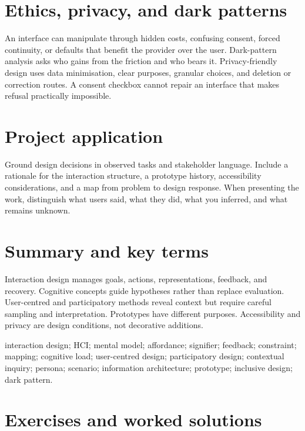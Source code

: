 \section{Ethics, privacy, and dark patterns}
An interface can manipulate through hidden costs, confusing consent, forced continuity, or defaults that benefit the provider over the user. Dark-pattern analysis asks who gains from the friction and who bears it. Privacy-friendly design uses data minimisation, clear purposes, granular choices, and deletion or correction routes. A consent checkbox cannot repair an interface that makes refusal practically impossible.

\section{Project application}
Ground design decisions in observed tasks and stakeholder language. Include a rationale for the interaction structure, a prototype history, accessibility considerations, and a map from problem to design response. When presenting the work, distinguish what users said, what they did, what you inferred, and what remains unknown.

\section{Summary and key terms}
Interaction design manages goals, actions, representations, feedback, and recovery. Cognitive concepts guide hypotheses rather than replace evaluation. User-centred and participatory methods reveal context but require careful sampling and interpretation. Prototypes have different purposes. Accessibility and privacy are design conditions, not decorative additions.

\begin{keyterms}interaction design; HCI; mental model; affordance; signifier; feedback; constraint; mapping; cognitive load; user-centred design; participatory design; contextual inquiry; persona; scenario; information architecture; prototype; inclusive design; dark pattern.\end{keyterms}

\section{Exercises and worked solutions}

